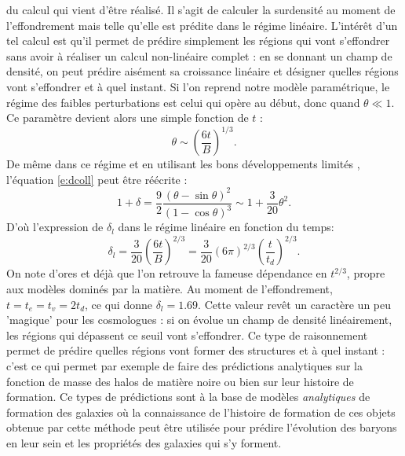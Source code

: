  du calcul qui vient d'être réalisé. Il s'agit de calculer la surdensité au moment de l'effondrement mais telle qu'elle est prédite dans le régime linéaire. L'intérêt d'un tel calcul est qu'il permet de prédire simplement les régions qui vont s'effondrer sans avoir à réaliser un calcul non-linéaire complet : en se donnant un champ de densité, on peut prédire aisément sa croissance linéaire et désigner quelles régions vont s'effondrer et à quel instant. Si l'on reprend notre modèle paramétrique, le régime des faibles perturbations est celui qui opère au début, donc quand $\theta \ll 1$. Ce paramètre devient alors une simple fonction de $t$ :
\begin{equation}
\theta \sim \left(\frac{6t}{B}\right)^{1/3}.
\end{equation}
De même dans ce régime et en utilisant les bons développements limités
, l'équation \ref{e:dcoll} peut être réécrite :
\begin{equation}
1+\delta =\frac{9}{2}\frac{(\theta -\sin \theta)^2}{(1-\cos \theta)^3}\sim 1+\frac{3}{20} \theta^2.
\end{equation}
D'où l'expression de $\delta_l$ dans le régime linéaire en fonction du temps:
\begin{equation}
\delta_l=\frac{3}{20}\left(\frac{6t}{B}\right)^{2/3}=\frac{3}{20}(6\pi)^{2/3}\left(\frac{t}{t_d}\right)^{2/3}.
\end{equation}
On note d'ores et déjà que l'on retrouve la fameuse dépendance en $t^{2/3}$, propre aux modèles dominés par la matière. Au moment de l'effondrement, $t=t_e=t_v=2t_d$, ce qui donne $\delta_l=1.69$. Cette valeur revêt un caractère un peu 'magique' pour les cosmologues : si on évolue un champ de densité linéairement, les régions qui dépassent ce seuil vont s'effondrer. Ce type de raisonnement permet de prédire quelles régions vont former des structures et à quel instant : c'est ce qui permet par exemple de faire des prédictions analytiques sur la fonction de masse des halos de matière noire ou bien sur leur histoire de formation. Ce types de prédictions sont à la base de modèles \textit{analytiques} de formation des galaxies où la connaissance de l'histoire de formation de ces objets obtenue par cette méthode peut être utilisée pour prédire l'évolution des baryons en leur sein et les propriétés des galaxies qui s'y forment.

